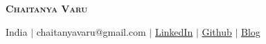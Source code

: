 \begin{center}
    \textbf{\Huge \scshape Chaitanya Varu} \\ \vspace{1pt}
    
    \small {} India $|$ 
     chaitanyavaru@gmail.com $|$ 
    \href{https://www.linkedin.com/in/chaitanya-varu}{ LinkedIn} $|$
    \href{https://github.com/hokageCV}{ Github} $|$  
    \href{https://hokagecv.github.io}{ Blog} 
    
\end{center}